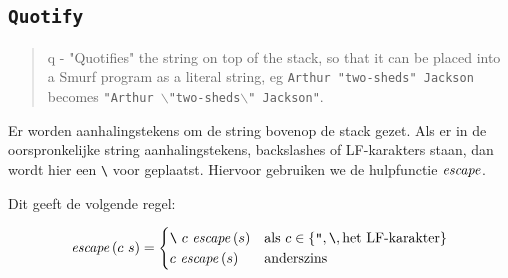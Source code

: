 \subsection{\texttt{Quotify}}
\label{sec:rules:quotify}

\begin{quote}
	q - "Quotifies" the string on top of the stack, so that it can be placed into
	a Smurf program as a literal string, eg \texttt{Arthur "two-sheds" Jackson}
	becomes \texttt{"Arthur $\backslash$"two-sheds$\backslash$" Jackson"}.
\end{quote}


Er worden aanhalingstekens om de string bovenop de stack gezet. Als er in de
oorspronkelijke string aanhalingstekens, backslashes of LF-karakters staan, dan
wordt hier een \verb$\$ voor geplaatst. Hiervoor gebruiken we de hulpfunctie
$\mathit{escape}$.

Dit geeft de volgende regel:
\therquotifyns%

$$
	\mathit{escape}\left(c~s\right) =
		\begin{cases}
			\texttt{\textbackslash}~c~\mathit{escape}\left(s\right) & \text{als
				$c\in\{\texttt{"},\texttt{\textbackslash},\text{het LF-karakter}\}$} \\
			c~\mathit{escape}\left(s\right) & \text{anderszins}
		\end{cases}
$$
